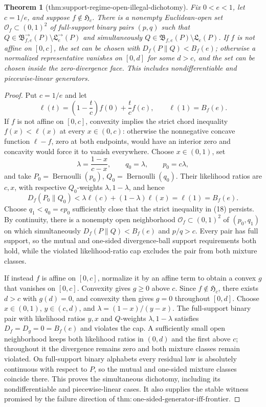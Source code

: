 \documentclass{article}
\newtheorem{theorem}{Theorem}
\begin{document}
\begin{theorem}[thm:support-regime-open-illegal-dichotomy]\label{thm:support-regime-open-illegal-dichotomy}
Fix \(0<e<1\), let \(c=1/e\), and suppose \(f\notin\mathfrak H_c\). There is a nonempty Euclidean-open set \(\mathcal O_f\subset(0,1)^2\) of full-support binary pairs \((p,q)\) such that \(Q\in\mathfrak B^{\to}_{f,e}(P)\setminus\mathfrak L^{\to}_e(P)\) and simultaneously \(Q\in\mathfrak B_{f,e}(P)\setminus\mathfrak L_e(P)\). If \(f\) is not affine on \([0,c]\), the set can be chosen with \(D_f(P\|Q)<B_f(e)\); otherwise a normalized representative vanishes on \([0,d]\) for some \(d>c\), and the set can be chosen inside the zero-divergence face. This includes nondifferentiable and piecewise-linear generators.
\end{theorem}
\begin{proof}
Put \(c=1/e\) and let
\[
 \ell(t)=\left(1-\frac tc\right)f(0)+\frac tc f(c),
 \qquad \ell(1)=B_f(e).
\]
If \(f\) is not affine on \([0,c]\), convexity implies the strict chord inequality \(f(x)<\ell(x)\) at every \(x\in(0,c)\): otherwise the nonnegative concave function \(\ell-f\), zero at both endpoints, would have an interior zero and concavity would force it to vanish everywhere.  Choose \(x\in(0,1)\), set
\[
 \lambda=\frac{1-x}{c-x},\qquad q_0=\lambda,\qquad p_0=c\lambda,
\]
and take \(P_0=\operatorname{Bernoulli}(p_0)\), \(Q_0=\operatorname{Bernoulli}(q_0)\).  Their likelihood ratios are \(c,x\), with respective \(Q_0\)-weights \(\lambda,1-\lambda\), and hence
\[
 D_f(P_0\|Q_0)<\lambda\ell(c)+(1-\lambda)\ell(x)=\ell(1)=B_f(e). \tag{18}
\]
Choose \(q_1<q_0=ep_0\) sufficiently close that the strict inequality in (18) persists.  By continuity, there is a nonempty open neighborhood \(\mathcal O_f\subset(0,1)^2\) of \((p_0,q_1)\) on which simultaneously \(D_f(P\|Q)<B_f(e)\) and \(p/q>c\).  Every pair has full support, so the mutual and one-sided divergence-ball support requirements both hold, while the violated likelihood-ratio cap excludes the pair from both mixture classes.

If instead \(f\) is affine on \([0,c]\), normalize it by an affine term to obtain a convex \(g\) that vanishes on \([0,c]\).  Convexity gives \(g\ge0\) above \(c\).  Since \(f\notin\mathfrak H_c\), there exists \(d>c\) with \(g(d)=0\), and convexity then gives \(g=0\) throughout \([0,d]\).  Choose \(x\in(0,1)\), \(y\in(c,d)\), and \(\lambda=(1-x)/(y-x)\).  The full-support binary pair with likelihood ratios \(y,x\) and \(Q\)-weights \(\lambda,1-\lambda\) satisfies \(D_f=D_g=0=B_f(e)\) and violates the cap.  A sufficiently small open neighborhood keeps both likelihood ratios in \((0,d)\) and the first above \(c\); throughout it the divergence remains zero and both mixture classes remain violated.  On full-support binary alphabets every residual law is absolutely continuous with respect to \(P\), so the mutual and one-sided mixture classes coincide there.  This proves the simultaneous dichotomy, including its nondifferentiable and piecewise-linear cases.  It also supplies the stable witness promised by the failure direction of \(\mathrm{thm:one\text{-}sided\text{-}generator\text{-}iff\text{-}frontier}\).
\end{proof}
\end{document}
